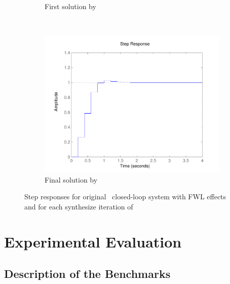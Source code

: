 \documentclass[final]{sig-alternate-05-2015}
\begin{document}
\begin{figure}
\begin{subfigure}[b]{0.3\textwidth}
        \caption{First solution by \tool}
        \label{fig:step1}
    \end{subfigure}
    ~
    \begin{subfigure}[b]{0.3\textwidth}
        \includegraphics[width=\textwidth]{figures/runningexample_step2.pdf}
        \caption{Final solution by \tool}
        \label{fig:step2}
    \end{subfigure}
    \caption{Step responses for original~\cite{DBLP:conf/hybrid/WangGRJF16}
             closed-loop system with FWL effects and for each
             {\sc synthesize} iteration of \tool}\label{fig:step}
\end{figure}

\section{Experimental Evaluation}\label{sec:experiments}


\subsection{Description of the Benchmarks}
\label{experimental-setup}
\end{document}
